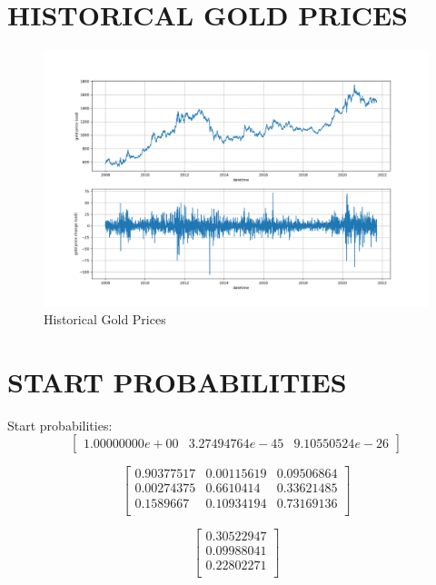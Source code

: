 \documentclass{article}
\begin{document}
\section{\MakeUppercase{Historical Gold Prices}}
\begin{figure}[!htb]
	\centering
	\begin{minipage}{1\textwidth}
			\centering
			\includegraphics[width=1\linewidth]{../first_image.png}
			\caption{Historical Gold Prices}
	\end{minipage}\hfill
\end{figure}

\section{\MakeUppercase{Start Probabilities}}
\begin{center}
Start probabilities:
\[
\begin{bmatrix}
	1.00000000e+00 & 3.27494764e-45 & 9.10550524e-26
\end{bmatrix}
\]
\end{center}
\[
\begin{bmatrix}
	0.90377517 & 0.00115619 & 0.09506864\\
	0.00274375 & 0.6610414 & 0.33621485\\
	0.1589667 & 0.10934194 & 0.73169136\\
\end{bmatrix}
\]

\[
\begin{bmatrix}
	0.30522947\\
	0.09988041\\
	0.22802271\\
\end{bmatrix}
\]
\end{document}
